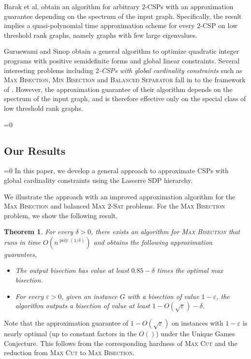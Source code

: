 \documentclass[11pt]{article}
\def\full{1}
\newtheorem{theorem}{Theorem}[section]
\theoremstyle{definition}
\DeclareMathOperator{\poly}{poly}
\newcommand{\etal}{et al.\xspace}
\newcommand{\problemmacro}[1]{\texorpdfstring{\textsc{#1}}{#1}\xspace}
\newcommand{\maxcut}{\problemmacro{Max Cut}}
\newcommand{\balancedseparator}{\problemmacro{Balanced Separator}}
\newcommand{\maxtwosat}{\problemmacro{Max $2$-Sat}}
\newcommand{\minbisection}{\problemmacro{Min Bisection}}
\newcommand{\maxbisection}{\problemmacro{Max Bisection}}
\let\epsilon=\varepsilon
\numberwithin{equation}{section}
\begin{document}
Barak \etal \cite{BarakRS11} obtain an algorithm for arbitrary
$2$-CSPs with an approximation guarantee depending on the spectrum of the
input graph.  Specifically, the result implies a quasi-polynomial time approximation scheme for every $2$-CSP on
low threshold rank graphs, namely graphs with few large eigenvalues.

Guruswami and Sinop \cite{GuruswamiS11} obtain a general algorithm to
optimize quadratic integer programs with positive semidefinite forms
and global linear constraints.  Several interesting
problems including {\it $2$-CSPs with  global cardinality constraints} such
as \maxbisection, \minbisection and \balancedseparator fall in to
the framework of \cite{GuruswamiS11}.  However, the approximation
guarantee of their algorithm depends on the spectrum of the input
graph, and is therefore effective only on the special class of
low threshold rank graphs.

\ifnum\full=0 \vspace{-8pt}\fi
\subsection{Our Results}
\ifnum\full=0 \vspace{-8pt}\fi
In this paper, we develop a general approach to approximate CSPs with
global cardinality constraints using the Lasserre SDP hierarchy.

We illustrate the approach with an improved approximation algorithm
for the \maxbisection and balanced \maxtwosat problems.  For the
\maxbisection problem, we show the following result.

\begin{theorem} \label{thm:max-bisection}
For every $\delta > 0$, there exists an algorithm for \maxbisection
that runs in time $O(n^{\poly(1/\delta)})$ and obtains the following
approximation guarantees,
\begin{itemize}
	\item The output bisection has value at least $0.85 - \delta$ times the
		optimal max bisection.
	\item For every $\epsilon > 0$, given an instance $G$ with a
		bisection of value $1-\epsilon$, the algorithm
		outputs a bisection of value at least $1 - O(\sqrt{\epsilon}) -
		\delta$.
\end{itemize}
\end{theorem}

Note that the approximation guarantee of $1- O(\sqrt{\epsilon})$ on
instances with $1-\epsilon$ is nearly optimal (up to constant factors
in the $O()$)
under the Unique Games Conjecture.  This follows from the
corresponding hardness of \maxcut and the reduction from \maxcut to
\maxbisection.
\end{document}
